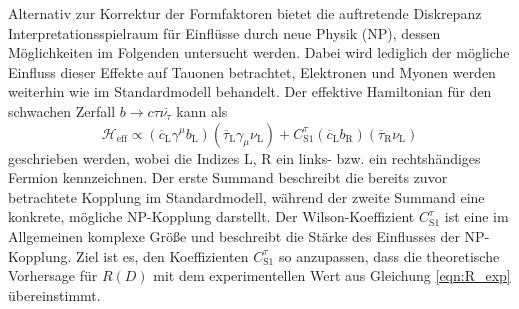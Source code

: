 Alternativ zur Korrektur der Formfaktoren bietet die auftretende Diskrepanz Interpretationsspielraum für Einflüsse durch neue Physik (NP), dessen Möglichkeiten im Folgenden untersucht werden.
Dabei wird lediglich der mögliche Einfluss dieser Effekte auf Tauonen betrachtet, Elektronen und Myonen werden weiterhin wie im Standardmodell behandelt.
Der effektive Hamiltonian für den schwachen Zerfall $b \to c \tau \overline{\nu_\tau}$ kann als
\begin{equation}
  \mathcal{H}_\text{eff} \propto (\overline{c}_\text{L} \gamma^\mu b_\text{L})(\overline{\tau}_\text{L} \gamma_\mu \nu_\text{L} ) +  C_{\text{S}1}^\tau (\overline {c}_\text{L} b_\text{R}) (\overline{\tau}_\text{R} \nu_\text{L})
\end{equation}
geschrieben werden, wobei die Indizes $\text{L}$, $\text{R}$ ein links- bzw. ein rechtshändiges Fermion kennzeichnen.
Der erste Summand beschreibt die bereits zuvor betrachtete Kopplung im Standardmodell, während der zweite Summand eine konkrete, mögliche NP-Kopplung darstellt.
Der Wilson-Koeffizient $C_{\text{S}1}^\tau$ ist eine im Allgemeinen komplexe Größe und beschreibt die Stärke des Einflusses der NP-Kopplung.
Ziel ist es, den Koeffizienten $C_{\text{S}1}^\tau$ so anzupassen, dass die theoretische Vorhersage für $R(D)$ mit dem experimentellen Wert aus Gleichung \eqref{eqn:R_exp} übereinstimmt.

